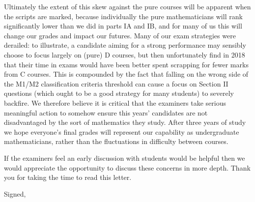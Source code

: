 \documentclass{letter}
\begin{document}
\begin{letter}{}
Ultimately the extent of this skew against the pure courses will be apparent when the scripts are marked, because individually the pure mathematicians will rank significantly lower than we did in parts IA and IB, and for many of us this will change our grades and impact our futures.
Many of our exam strategies were derailed: to illustrate, a candidate aiming for a strong performance may sensibly choose to focus largely on (pure) D courses, but then unfortunately find in 2018 that their time in exams would have been better spent scrapping for fewer marks from C courses.
This is compounded by the fact that falling on the wrong side of the M1/M2 classification criteria threshold can cause a focus on Section II questions (which ought to be a good strategy for many students) to severely backfire.
We therefore believe it is critical that the examiners take serious meaningful action to somehow ensure this years' candidates are not disadvantaged by the sort of mathematics they study.
After three years of study we hope everyone's final grades will represent our capability as undergraduate mathematicians, rather than the fluctuations in difficulty between courses.

If the examiners feel an early discussion with students would be helpful then we would appreciate the opportunity to discuss these concerns in more depth.
Thank you for taking the time to read this letter.

\closing{Signed,}

\end{letter}
\end{document}
